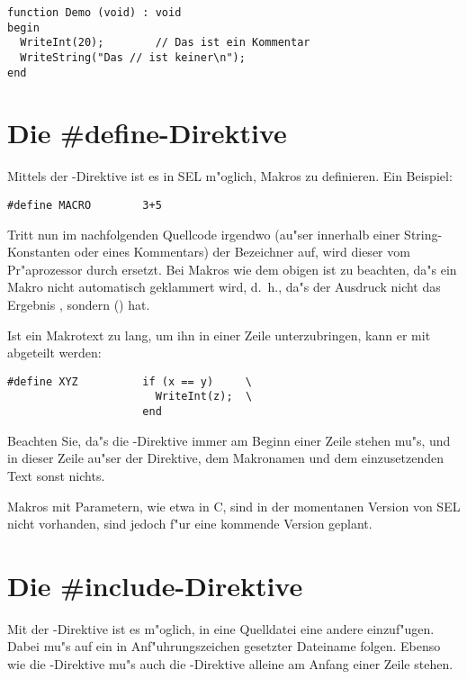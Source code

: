\example
{}
\begin{verbatim}
function Demo (void) : void
begin
  WriteInt(20);        // Das ist ein Kommentar
  WriteString("Das // ist keiner\n");
end
\end{verbatim}

\section{Die \#define-Direktive}

Mittels der -Direktive ist es in SEL m"oglich,
Makros
zu definieren. Ein Beispiel:

\begin{verbatim}
#define MACRO        3+5
\end{verbatim}

Tritt nun im nachfolgenden Quellcode irgendwo (au"ser innerhalb
einer String-Konstanten
oder eines Kommentars) der Bezeichner
 auf, wird dieser vom Pr"aprozessor durch 
ersetzt. Bei Makros wie dem obigen ist zu beachten, da"s ein
Makro nicht automatisch geklammert wird, d.~h., da"s der Ausdruck
 nicht das Ergebnis , sondern 
() hat.

Ist ein Makrotext zu lang, um ihn in einer Zeile unterzubringen,
kann er mit 
abgeteilt werden:

\begin{verbatim}
#define XYZ          if (x == y)     \
                       WriteInt(z);  \
                     end
\end{verbatim}

Beachten Sie, da"s die -Direktive immer am Beginn
einer Zeile stehen mu"s, und in dieser Zeile au"ser der Direktive, dem
Makronamen und dem einzusetzenden Text sonst nichts.

Makros mit Parametern, wie etwa in C, sind in der momentanen
Version von SEL nicht vorhanden, sind jedoch f"ur eine kommende
Version geplant.

\section{Die \#include-Direktive}

Mit der -Direktive ist es m"oglich, in eine
Quelldatei eine andere einzuf"ugen. Dabei mu"s auf 
ein in Anf"uhrungszeichen gesetzter Dateiname folgen. Ebenso wie
die \fu{\#define}-Direktive mu"s auch die
\fu{\#include}-Direktive alleine am Anfang einer Zeile stehen.


